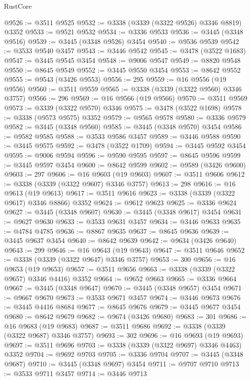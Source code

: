 \begin{lexlean}{RustCore}
\begin{coremodule}
@9526 := @3511 @9525
@9532 := @3338 (@3339 (@3322 @9526) @3346 @8819) @3352
@9533 := @9521 @9532
@9534 := @3336 @9533
@9536 := @3445 (@3348 @9516)
@9539 := @3445 (@3348 @9526) @3454
@9540 := @9536 @9539
@9542 := @3533 @9540 @3457
@9543 := @3446 @9542
@9545 := @3478 (@3522 @1683)
@9547 := @3445 @9545 @3454
@9548 := @9006 @9547
@9549 := @8820 @9548
@9550 := @8645 @9549
@9552 := @3445 @9550 @3454
@9553 := @8642 @9552
@9555 := @9543 (@3426 @9553)
@9556 := 295
@9559 := @16 @9556 (@19 @9556)
@9560 := @3511 @9559
@9565 := @3338 (@3339 (@3322 @9560) @3346 @3757)
@9566 := 296
@9569 := @16 @9566 (@19 @9566)
@9570 := @3511 @9569
@9573 := @3339 (@3322 @9570) @3346
@9575 := @3478 (@3522 @1698)
@9578 := @3338 (@9573 @9575) @3352
@9579 := @9565 @9578
@9580 := @3336 @9579
@9582 := @3445 (@3348 @9560)
@9585 := @3445 (@3348 @9570) @3454
@9586 := @9582 @9585
@9588 := @3533 @9586 @3457
@9589 := @3446 @9588
@9590 := @3445 @9575
@9592 := @3478 (@3522 @1709)
@9594 := @3445 @9592 @3454
@9595 := @9006 @9594
@9596 := @9590 @9595
@9597 := @8645 @9596
@9599 := @3445 @9597 @3454
@9600 := @8642 @9599
@9602 := @9589 (@3426 @9600)
@9603 := 297
@9606 := @16 @9603 (@19 @9603)
@9607 := @3511 @9606
@9612 := @3338 (@3339 (@3322 @9607) @3346 @3757)
@9613 := 298
@9616 := @16 @9613 (@19 @9613)
@9617 := @3511 @9616
@9623 := @3338 (@3339 (@3322 @9617) @3346 @8866) @3352
@9624 := @9612 @9623
@9625 := @3336 @9624
@9627 := @3445 (@3348 @9607)
@9630 := @3445 (@3348 @9617) @3454
@9631 := @9627 @9630
@9633 := @3533 @9631 @3457
@9634 := @3446 @9633
@9635 := @4784 @4785
@9636 := @8867 @9635
@9637 := @8645 @9636
@9639 := @3445 @9637 @3454
@9640 := @8642 @9639
@9642 := @9634 (@3426 @9640)
@9643 := 299
@9646 := @16 @9643 (@19 @9643)
@9647 := @3511 @9646
@9652 := @3338 (@3339 (@3322 @9647) @3346 @3757)
@9653 := 300
@9656 := @16 @9653 (@19 @9653)
@9657 := @3511 @9656
@9663 := @3338 (@3339 (@3322 @9657) @3346 @4416) @3352
@9664 := @9652 @9663
@9665 := @3336 @9664
@9667 := @3445 (@3348 @9647)
@9670 := @3445 (@3348 @9657) @3454
@9671 := @9667 @9670
@9673 := @3533 @9671 @3457
@9674 := @3446 @9673
@9676 := @3445 @4416 @8684
@9677 := @8645 @9676
@9679 := @3445 @9677 @3454
@9680 := @8642 @9679
@9682 := @9674 (@3426 @9680)
@9683 := 301
@9686 := @16 @9683 (@19 @9683)
@9687 := @3511 @9686
@9692 := @3338 (@3339 (@3322 @9687) @3346 @3757)
@9693 := 302
@9696 := @16 @9693 (@19 @9693)
@9697 := @3511 @9696
@9703 := @3338 (@3339 (@3322 @9697) @3346 @4463) @3352
@9704 := @9692 @9703
@9705 := @3336 @9704
@9707 := @3445 (@3348 @9687)
@9710 := @3445 (@3348 @9697) @3454
@9711 := @9707 @9710
@9713 := @3533 @9711 @3457
@9714 := @3446 @9713

\end{coremodule}
\end{lexlean}
